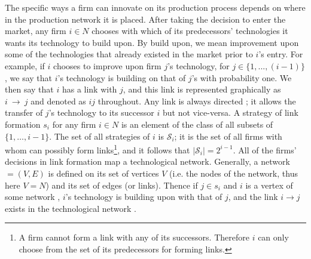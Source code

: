 \documentclass{article}
\begin{document}
\indent The specific ways a firm can innovate on its production process depends on where in the production network it is placed. After taking the decision to enter the market, any firm $i\in N$ chooses with which of its predecessors' technologies it wants its technology to build upon. By build upon, we mean improvement upon some of the technologies that already existed in the market prior to $i$'s entry. For example, if $i$ chooses to improve upon firm $j$'s technology, for $j\in \{1,...,(i-1)\}$, we say that $i$'s technology is building on that of $j$'s with probability one. We then say that $i$ has a link with $j$, and this link is represented graphically as $i~\rightarrow ~j$ and denoted as $ij$ throughout. Any link is always directed ; it allows the transfer of $j$'s technology to its successor $i$ but not vice-versa. A strategy of link formation $s_i$ for any firm $i\in N$ is an element of the class of all subsets of $\{1,\ldots , i-1\}$.  The set of all strategies of $i$ is $\mathcal{S}_i$; it is the set of all firms with whom can possibly form links\footnote{A firm cannot form a link with any of its successors. Therefore $i$ can only choose from the set of its predecessors for forming links.}, and it follows that $|\mathcal{S}_i|=2^{i-1}$. All of the firms' decisions in link formation map a technological network. Generally, a network $=(V,E)$ is defined on its set of vertices $V$ (i.e. the nodes of the network, thus here $V=N$) and its set of edges (or links). Thence if $j\in s_i$ and $i$ is a vertex of some network , $i$'s technology is building upon with that of $j$, and the link $i\rightarrow j$ exists in the technological network . 
\end{document}
